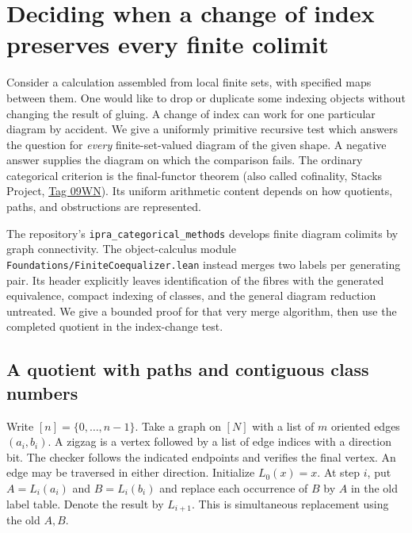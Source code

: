 \section{Deciding when a change of index preserves every finite colimit}
\label{sec:effective-finality}

Consider a calculation assembled from local finite sets, with specified maps between them. One would like to drop or duplicate some indexing objects without changing the result of gluing. A change of index can work for one particular diagram by accident. We give a uniformly primitive recursive test which answers the question for \emph{every} finite-set-valued diagram of the given shape. A negative answer supplies the diagram on which the comparison fails. The ordinary categorical criterion is the final-functor theorem (also called cofinality, Stacks Project, \href{https://stacks.math.columbia.edu/tag/09WN}{Tag 09WN}). Its uniform arithmetic content depends on how quotients, paths, and obstructions are represented.

The repository's \texttt{ipra\_categorical\_methods} develops finite diagram colimits by graph connectivity. The object-calculus module \texttt{Foundations/FiniteCoequalizer.lean} instead merges two labels per generating pair. Its header explicitly leaves identification of the fibres with the generated equivalence, compact indexing of classes, and the general diagram reduction untreated. We give a bounded proof for that very merge algorithm, then use the completed quotient in the index-change test.

\subsection{A quotient with paths and contiguous class numbers}

Write $[n]=\{0,\ldots,n-1\}$. Take a graph on $[N]$ with a list of $m$ oriented edges $(a_i,b_i)$. A zigzag is a vertex followed by a list of edge indices with a direction bit. The checker follows the indicated endpoints and verifies the final vertex. An edge may be traversed in either direction. Initialize $L_0(x)=x$. At step $i$, put $A=L_i(a_i)$ and $B=L_i(b_i)$ and replace each occurrence of $B$ by $A$ in the old label table. Denote the result by $L_{i+1}$. This is simultaneous replacement using the old $A,B$.

